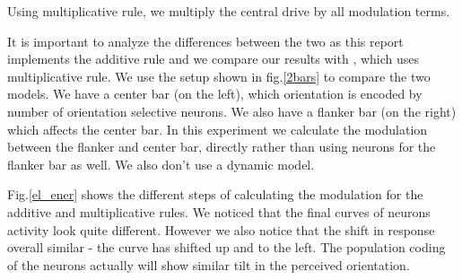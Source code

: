 

Using multiplicative rule, we multiply the central drive by all modulation terms.



It is important to analyze the differences between the two as this report implements the additive rule and we compare our results with \cite{keemink2015unified}, which uses multiplicative rule. We use the setup shown in fig.\ref{2bars} to compare the two models. We have a center bar (on the left), which orientation is encoded by number of orientation selective neurons. We also have a flanker bar (on the right) which affects the center bar. In this experiment we calculate the modulation between the flanker and center bar, directly rather than using neurons for the flanker bar as well. We also don't use a dynamic model. 




Fig.\ref{el_ener} shows the different steps of calculating the modulation for the additive and multiplicative rules. We noticed that the final curves of neurons activity look quite different. However we also notice that the shift in response overall similar - the curve has shifted up and to the left. The population coding of the neurons actually will show similar tilt in the perceived orientation. 

